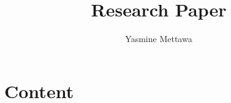 \documentclass{article}
\title{Research Paper}
\date{\displaydate{articleDate}}
\author{Yasmine Mettawa\\
}
\begin{document}
\maketitle



\part{Content}





















\end{document}
